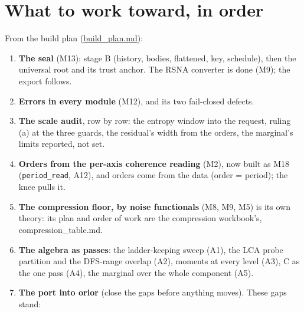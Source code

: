 \section{\texorpdfstring{What to work toward, in order}{What to work toward, in order}}

From the build plan (\hyperref[chap:build-plan]{build\_\allowbreak{}plan.md}):

\begin{enumerate}
\item \textbf{The seal} (M13): stage B (history, bodies, flattened, key, schedule), then the universal root and its trust anchor. The RSNA converter is done (M9); the export follows.
\item \textbf{Errors in every module} (M12), and its two fail-closed defects.
\item \textbf{The scale audit}, row by row: the entropy window into the request, ruling (a) at the three guards, the residual's width from the orders, the marginal's limits reported, not set.
\item \textbf{Orders from the per-axis coherence reading} (M2), now built as M18 (\texttt{period\_\allowbreak{}read}, A12), and orders come from the data (order = period); the knee pulls it.
\item \textbf{The compression floor, by noise functionals} (M8, M9, M5) is its own theory: its plan and order of work are the compression workbook's, compression\_\allowbreak{}table.md.
\item \textbf{The algebra as passes}: the ladder-keeping sweep (A1), the LCA probe partition and the DFS-range overlap (A2), moments at every level (A3), C as the one pass (A4), the marginal over the whole component (A5).
\item \textbf{The port into orior} (close the gaps before anything moves). These gaps stand:


\end{enumerate}

